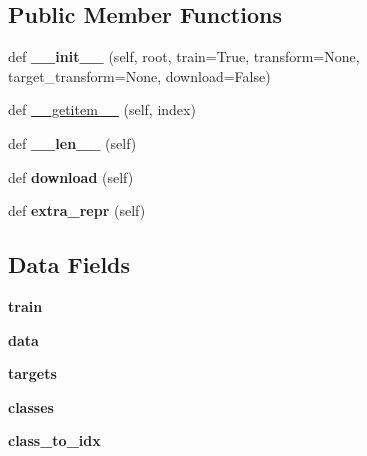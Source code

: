 \subsection*{Public Member Functions}
\begin{DoxyCompactItemize}
\item 
\mbox{\label{classtorchvision_1_1datasets_1_1cifar_1_1CIFAR10_a13454259743c3c8dd82d67e6a35f9f65}} 
def {\bfseries \+\_\+\+\_\+init\+\_\+\+\_\+} (self, root, train=True, transform=None, target\+\_\+transform=None, download=False)
\item 
def \hyperlink{classtorchvision_1_1datasets_1_1cifar_1_1CIFAR10_a2f1865e00fdbf4e04f262008c2564895}{\+\_\+\+\_\+getitem\+\_\+\+\_\+} (self, index)
\item 
\mbox{\label{classtorchvision_1_1datasets_1_1cifar_1_1CIFAR10_a8fe228dd4819e0cdff0dcd4d7ab825ea}} 
def {\bfseries \+\_\+\+\_\+len\+\_\+\+\_\+} (self)
\item 
\mbox{\label{classtorchvision_1_1datasets_1_1cifar_1_1CIFAR10_a59b97ee83616d2c582131e7004c5145a}} 
def {\bfseries download} (self)
\item 
\mbox{\label{classtorchvision_1_1datasets_1_1cifar_1_1CIFAR10_a8dfac082305625bdd1b880b912ee3a43}} 
def {\bfseries extra\+\_\+repr} (self)
\end{DoxyCompactItemize}
\subsection*{Data Fields}
\begin{DoxyCompactItemize}
\item 
\mbox{\label{classtorchvision_1_1datasets_1_1cifar_1_1CIFAR10_af3e8b5d81e6a08ceaa5b5735c63f2297}} 
{\bfseries train}
\item 
\mbox{\label{classtorchvision_1_1datasets_1_1cifar_1_1CIFAR10_a4d57849c7f82a4df8f1f21e5f6f91af6}} 
{\bfseries data}
\item 
\mbox{\label{classtorchvision_1_1datasets_1_1cifar_1_1CIFAR10_a65a537e2057f67da02157d616f470c0a}} 
{\bfseries targets}
\item 
\mbox{\label{classtorchvision_1_1datasets_1_1cifar_1_1CIFAR10_aca8dd72cf8ea3e71e578133fb3f52f96}} 
{\bfseries classes}
\item 
\mbox{\label{classtorchvision_1_1datasets_1_1cifar_1_1CIFAR10_a1b333e39c36e6ad02eed15c931a2e9c5}} 
{\bfseries class\+\_\+to\+\_\+idx}
\end{DoxyCompactItemize}
